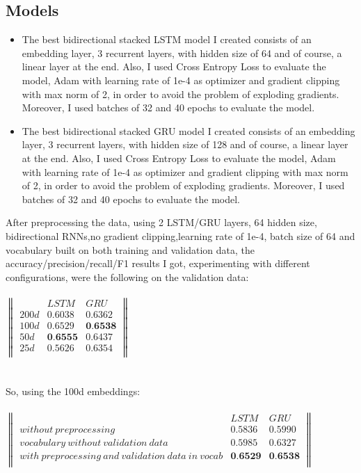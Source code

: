 \documentclass{article}
\begin{document}
\subsection{Models}
\begin{itemize}
\item The best bidirectional stacked LSTM model I created consists of an embedding layer, 3 recurrent layers, with hidden size of 64 and of course, a linear layer at the end. Also, I used Cross Entropy Loss to evaluate the model, Adam with learning rate of 1e-4 as optimizer and gradient clipping with max norm of 2, in order to avoid the problem of exploding gradients. Moreover, I used batches of 32 and 40 epochs to evaluate the model.

\item The best bidirectional stacked GRU model I created consists of an embedding layer, 3 recurrent layers, with hidden size of 128 and of course, a linear layer at the end. Also, I used Cross Entropy Loss to evaluate the model, Adam with learning rate of 1e-4 as optimizer and gradient clipping with max norm of 2, in order to avoid the problem of exploding gradients. Moreover, I used batches of 32 and 40 epochs to evaluate the model.
\end{itemize}
After preprocessing the data, using 2 LSTM/GRU layers, 64 hidden size, bidirectional RNNs,no gradient clipping,learning rate of 1e-4, batch size of 64 and vocabulary built on both training and validation data, the accuracy/precision/recall/F1 results I got, experimenting with different configurations, were the following on the validation data: \\ \\
$\begin{Vmatrix}
& LSTM & GRU \\
200d  & 0.6038 & 0.6362\\
100d  & 0.6529 & \textbf{0.6538}\\
50d  & \textbf{0.6555} & 0.6437\\
25d  & 0.5626 & 0.6354\\
\end{Vmatrix}$ \\ \\ \\
So, using the 100d embeddings: \\ \\
$\begin{Vmatrix}
& LSTM & GRU \\
without\ preprocessing  & 0.5836 & 0.5990\\
vocabulary\ without\ validation\ data  & 0.5985 & 0.6327\\
with\ preprocessing\ and\ validation\ data\ in\ vocab & \textbf{0.6529} & \textbf{0.6538} \\
\end{Vmatrix}$ \\ \\ \\
\end{document}
